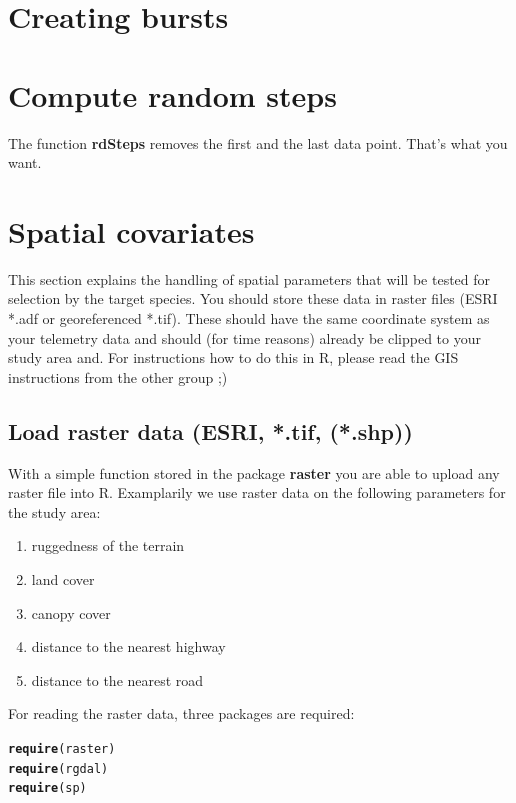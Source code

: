 \documentclass[11pt, a4paper]{article}\usepackage[]{graphicx}\usepackage[]{color}
\makeatletter
\newcommand{\hlstd}[1]{\textcolor[rgb]{0.345,0.345,0.345}{#1}}%
\newcommand{\hlkwd}[1]{\textcolor[rgb]{0.737,0.353,0.396}{\textbf{#1}}}%
\newenvironment{kframe}{%
 \def\at@end@of@kframe{}%
 \ifinner\ifhmode%
  \def\at@end@of@kframe{\end{minipage}}%
  \begin{minipage}{\columnwidth}%
 \fi\fi%
 \def\FrameCommand##1{\hskip\@totalleftmargin \hskip-\fboxsep
 \colorbox{shadecolor}{##1}\hskip-\fboxsep
     \hskip-\linewidth \hskip-\@totalleftmargin \hskip\columnwidth}%
 \MakeFramed {\advance\hsize-\width
   \@totalleftmargin\z@ \linewidth\hsize
   \@setminipage}}%
 {\par\unskip\endMakeFramed%
 \at@end@of@kframe}
\newenvironment{knitrout}{}{} %
\makeatother
\begin{document}
\section{Creating bursts}


\section{Compute random steps}

The function \textbf{rdSteps} removes the first and the last data point. That's what you want. 



\section{Spatial covariates}%
This section explains the handling of spatial parameters that will be tested for selection by the target species. You should store these data in raster files (ESRI *.adf or georeferenced *.tif). These should have the same coordinate system as your telemetry data and should (for time reasons) already be clipped to your study area and. For instructions how to do this in R, please read the GIS instructions from the other group ;)   

\subsection{Load raster data (ESRI, *.tif, (*.shp))}%

With a simple function stored in the package \textbf{raster} you are able to upload any raster file into R. Examplarily we use raster data on the following parameters for the study area:
\begin{enumerate}
\item{ruggedness of the terrain}
\item{land cover}
\item{canopy cover}
\item{distance to the nearest highway}
\item{distance to the nearest road}
\end{enumerate}

For reading the raster data, three packages are required:
\begin{knitrout}
\color{fgcolor}\begin{kframe}
\begin{alltt}
\hlkwd{require}\hlstd{(raster)}
\hlkwd{require}\hlstd{(rgdal)}
\hlkwd{require}\hlstd{(sp)}
\end{alltt}
\end{kframe}
\end{knitrout}
\end{document}
